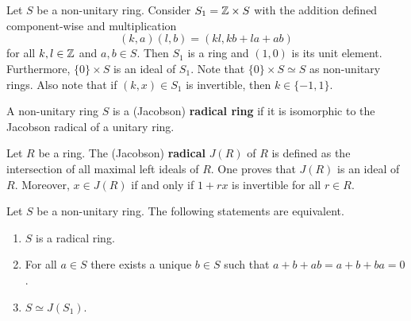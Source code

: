 \chapter{}


Let $S$ be a non-unitary ring. Consider $S_1=\mathbb{Z}\times S$ with the addition defined component-wise and  multiplication
\[
(k,a)(l,b)=(kl,kb+la+ab)
\]
for all $k,l\in\mathbb{Z}$ and $a,b\in S$. 
Then $S_1$ is a ring and $(1,0)$ is its unit element. 
Furthermore, $\{0\}\times S$ is an ideal of $S_1$. 
Note that $\{0\}\times S\simeq S$ as non-unitary rings. Also 
note that if $(k,x)\in S_1$ is invertible, 
then $k\in\{-1,1\}$. 

\begin{definition}
    A non-unitary ring $S$ is a (Jacobson) \textbf{radical ring} 
    if it is isomorphic to the Jacobson radical of a unitary ring.
\end{definition}

Let $R$ be a ring. The (Jacobson) \textbf{radical} $J(R)$ of $R$ is defined as the intersection
of all maximal left ideals of $R$. One proves that $J(R)$ is an ideal of $R$. Moreover, 
$x\in J(R)$ if and only if $1+rx$ is invertible for all $r\in R$.

\begin{proposition}
\label{pro:radical}
	Let $S$ be a non-unitary ring. The following statements are equivalent.
	\begin{enumerate}
		\item $S$ is a radical ring.
		\item For all $a\in S$ there exists a unique $b\in S$ such that $a+b+ab=a+b+ba=0$.
		\item $S\simeq J(S_1)$. 
	\end{enumerate}
\end{proposition}  
	
